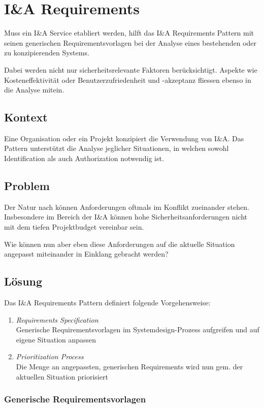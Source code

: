 \section{I\&A Requirements}

Muss ein I\&A Service etabliert werden, hilft das I\&A Requirements Pattern mit seinen generischen Requirementsvorlagen bei der Analyse eines bestehenden oder zu konzipierenden Systems.

Dabei werden nicht nur sicherheitsrelevante Faktoren berücksichtigt. Aspekte wie Kosteneffektivität oder Benutzerzufriedenheit und -akzeptanz fliessen ebenso in die Analyse mitein.

\subsection*{Kontext}
Eine Organisation oder ein Projekt konzipiert die Verwendung von I\&A. Das Pattern unterstützt die Analyse jeglicher Situationen, in welchen sowohl Identification als auch Authorization notwendig ist.

\subsection*{Problem}
Der Natur nach können Anforderungen oftmals im Konflikt zueinander stehen. Insbesondere im Bereich der I\&A können hohe Sicherheitsanforderungen nicht mit dem tiefen Projektbudget vereinbar sein.

Wie können nun aber eben diese Anforderungen auf die aktuelle Situation angepasst miteinander in Einklang gebracht werden?

\subsection*{Lösung}
Das I\&A Requirements Pattern definiert folgende Vorgehensweise:

\begin{enumerate}
	\item \emph{Requirements Specification}\\
	Generische Requirementsvorlagen im Systemdesign-Prozess aufgreifen und auf eigene Situation anpassen
	\item \emph{Prioritization Process}\\
	Die Menge an angepassten, generischen Requirements wird nun gem. der aktuellen Situation priorisiert
\end{enumerate}

\subsubsection*{Generische Requirementsvorlagen}

